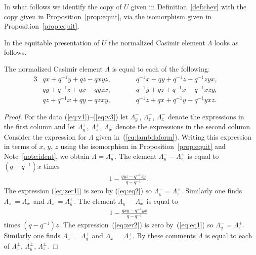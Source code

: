 \begin{Note}
\label{note:ident}
In what follows we identify the copy of
$U$ given in
Def\/inition~\ref{def:chev}
with
the copy given in
Proposition~\ref{prop:equit},
via the isomorphism given in
Proposition~\ref{prop:equit}.
\end{Note}


In the equitable presentation
of $U$
the normalized Casimir element $\Lambda$ looks as follows.

\begin{Lemma}
\label{lem:sixforms}
The normalized Casimir element $\Lambda$ is equal to each of
the following:
\begin{alignat}{3}
& qx+q^{-1}y+qz-qxyz,
\qquad &&
q^{-1}x+qy+q^{-1}z-q^{-1}zyx, &
\label{eq:v1}
\\
& qy+q^{-1}z+qx-qyzx,
\qquad &&
q^{-1}y+qz+q^{-1}x-q^{-1}xzy,&
\label{eq:v2}
\\
& qz+q^{-1}x+qy-qzxy,
\qquad &&
q^{-1}z+qx+q^{-1}y-q^{-1}yxz.&
\label{eq:v3}
\end{alignat}
\end{Lemma}

\begin{proof}
For the data
(\ref{eq:v1})--(\ref{eq:v3})
let
$\Lambda^-_y$, $\Lambda^-_z$, $\Lambda^-_x$
denote the
expressions in the f\/irst column
and let
$\Lambda^+_y$, $\Lambda^+_z$, $\Lambda^+_x$ denote
the
expressions in the second column.
Consider the expression for
$\Lambda$ given in~(\ref{eq:lambdaform}).
Writing this expression in terms of $x$, $y$, $z$ using
the isomorphism in
Proposition~\ref{prop:equit} and Note~\ref{note:ident},
we obtain
$\Lambda=\Lambda^-_y$.
The element $\Lambda^-_y-\Lambda^+_z$ is equal to
$(q-q^{-1})x$ times
\begin{gather}
1 - \frac{qyz-q^{-1}zy}{q-q^{-1}}.
\label{eq:zer1}
\end{gather}
The expression
(\ref{eq:zer1}) is zero by
(\ref{eq:eq2}) so
$\Lambda^-_y=\Lambda^+_z$.
Similarly one f\/inds
$\Lambda^-_z=\Lambda^+_x$ and
$\Lambda^-_x=\Lambda^+_y$.
The element $\Lambda^-_y-\Lambda^+_x$ is equal to
\begin{gather}
1 - \frac{qxy-q^{-1}yx}{q-q^{-1}}
\label{eq:zer2}
\end{gather}
times
$(q-q^{-1})z$.
The expression~(\ref{eq:zer2}) is zero by~(\ref{eq:eq1}) so
$\Lambda^-_y=\Lambda^+_x$.
Similarly one f\/inds
$\Lambda^-_z=\Lambda^+_y$ and
$\Lambda^-_x=\Lambda^+_z$.
By these comments $\Lambda$ is equal to each of
$\Lambda^{\pm }_x$, $\Lambda^{\pm }_y$, $\Lambda^{\pm }_z$.
\end{proof}



